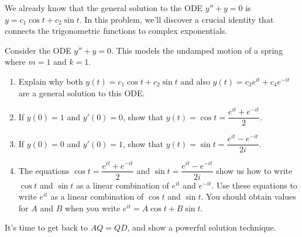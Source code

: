  We already know that the general solution to the ODE $y''+y=0$ is $y=c_1\cos t+c_2\sin t$. In this problem, we'll discover a crucial identity that connects the trigonometric functions to complex exponentials.

\begin{problem}
 Consider the ODE $y''+y=0$. This models the undamped motion of a spring where $m=1$ and $k=1$.    
\begin{enumerate}
 \item Explain why both $y(t) = c_1\cos t+c_2\sin t$ and also $y(t) = c_3 e^{it}+c_4e^{-it}$ are a general solution to this ODE.
 \item If $y(0)=1$ and $y'(0)=0$, show that $y(t)=\cos t=\dfrac{e^{it}+e^{-it}}{2}$.
 \item If $y(0)=0$ and $y'(0)=1$, show that $y(t)=\sin t=\dfrac{e^{it}-e^{-it}}{2i}$.
 \item The equations $\cos t=\dfrac{e^{it}+e^{-it}}{2}$ and $\sin t=\dfrac{e^{it}-e^{-it}}{2i}$ show us how to write $\cos t$ and $\sin t$ as a linear combination of $e^{it}$ and $e^{-it}$. Use these equations to write $e^{it}$ as a linear combination of $\cos t$ and $\sin t$.  You should obtain values for $A$ and $B$ when you write $e^{it} = A\cos t+B\sin t$. 
\end{enumerate}

\end{problem}










It's time to get back to $AQ=QD$, and show a powerful solution technique. 

